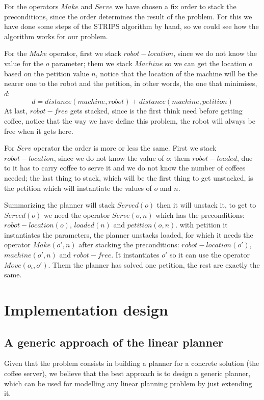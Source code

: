 \documentclass[12pt,a4paper,oneside]{article}
\numberwithin{equation}{section}
\numberwithin{equation}{section}
\theoremstyle{definition}
\begin{document}
For the operators $Make$ and $Serve$ we have chosen a fix order to stack the preconditions, since the order determines the result of the problem. For this we have done some steps of the STRIPS algorithm by hand, so we could see how the algorithm works for our problem.

For the $Make$ operator, first we stack $robot-location$, since we do not know the value for the $o$ parameter; them we stack $Machine$ so we can get the location $o$ based on the petition value $n$, notice that the location of the machine will be the nearer one to the robot and the petition, in other words, the one that minimises, $d$:
$$d = distance(machine, robot) + distance(machine, petition)$$
 At last, $robot- free$ gets stacked, since is the first think need before getting coffee, notice that the way we have define this problem, the robot will always be free when it gets here.
 
 For $Serv$ operator the order is more or less the same. First we stack $robot-location$, since we do not know the value of $o$; them $robot-loaded$, due to it has to carry coffee to serve it and we do not know the number of coffees needed; the last thing to stack, which will be the first thing to get unstacked, is the petition which will instantiate the values of $o$ and $n$.
 
 Summarizing the planner will stack $Served(o)$ then it will unstack it, to get to $Served(o)$ we need the operator $Serve(o,n)$ which has the preconditions: $robot-location(o)$, $ loaded(n) $ and $petition(o,n)$. with petition it instantiates the parameters, the planner unstacks loaded, for which it needs the operator $Make(o',n)$ after stacking the preconditions: $robot-location(o')$, $machine(o',n)$ and $robot-free$. It instantiates $o'$ so it can use the operator $Move(o_i,o')$. Them the planner has solved one petition, the rest are exactly the same.

\section{Implementation design}

\subsection{A generic approach of the linear planner}
Given that the problem consists in building a planner for a concrete solution (the coffee server), we believe that the best approach is to design a generic planner, which can be used for modelling any linear planning problem by just extending it.
\end{document}
